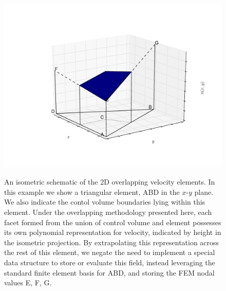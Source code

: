 
\begin{figure}[htp]
\begin{center}
\hbox{\hspace{-3.7cm}
\includegraphics[width=1.4\textwidth]{diagrams/overlapping}}
\caption{An isometric schematic of the 2D overlapping velocity
  elements. In this example we show a triangular element, ABD in the
  $x$-$y$ plane. We also indicate the contol volume boundaries lying
  within this element. Under the overlapping methodology presented
  here, each facet formed from the union of control volume and element
  possesses its own polynomial representation for velocity, indicated
  by height in the isometric projection. By extrapolating this
  representation across the rest of this element, we negate the need
  to implement a special data structure to store or evaluate this
  field, instead leveraging the standard finite element basis for ABD,
  and storing the FEM nodal values E, F, G. }
\label{fig:overlapping2d}
\end{center}
\end{figure}





